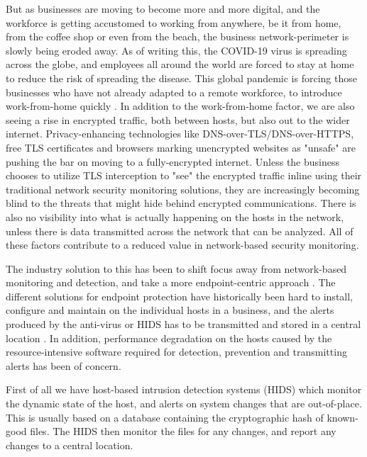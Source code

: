 But as businesses are moving to become more and more digital, and the workforce is getting accustomed to working from anywhere, be it from home, from the coffee shop or even from the beach, the business network-perimeter is slowly being eroded away.
As of writing this, the COVID-19 virus is spreading across the globe, and employees all around the world are forced to stay at home to reduce the risk of spreading the disease. This global pandemic is forcing those businesses who have not already adapted to a remote workforce, to introduce work-from-home quickly \cite{kramer_2020}.
In addition to the work-from-home factor, we are also seeing a rise in encrypted traffic, both between hosts, but also out to the wider internet. Privacy-enhancing technologies like DNS-over-TLS/DNS-over-HTTPS, free TLS certificates and browsers marking unencrypted websites as "unsafe" are pushing the bar on moving to a fully-encrypted internet. Unless the business chooses to utilize TLS interception to "see" the encrypted traffic inline using their traditional network security monitoring solutions, they are increasingly becoming blind to the threats that might hide behind encrypted communications. There is also no visibility into what is actually happening on the hosts in the network, unless there is data transmitted across the network that can be analyzed. All of these factors contribute to a reduced value in network-based security monitoring.

The industry solution to this has been to shift focus away from network-based monitoring and detection, and take a more endpoint-centric approach \cite{liu_2019}. The different solutions for endpoint protection have historically been hard to install, configure and maintain on the individual hosts in a business, and the alerts produced by the anti-virus or HIDS has to be transmitted and stored in a central location \cite{brattstrom_2017}. In addition, performance degradation on the hosts caused by the resource-intensive software required for detection, prevention and transmitting alerts has been of concern.

First of all we have host-based intrusion detection systems (HIDS) which monitor the dynamic state of the host, and alerts on system changes that are out-of-place. This is usually based on a database containing the cryptographic hash of known-good files. The HIDS then monitor the files for any changes, and report any changes to a central location.

